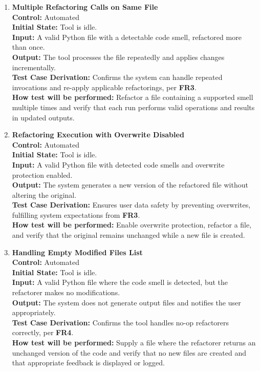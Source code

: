 \documentclass[12pt, titlepage]{article}
\begin{document}
\begin{enumerate}[label={\bf
\textcolor{Maroon}{test-FR-IA-\arabic*}}, wide=0pt, font=\itshape]
\item \textbf{Multiple Refactoring Calls on Same File} \\[2mm]
\textbf{Control:} Automated \\
\textbf{Initial State:} Tool is idle. \\
\textbf{Input:} A valid Python file with a detectable code smell, refactored more than once. \\
\textbf{Output:} The tool processes the file repeatedly and applies changes incrementally. \\[2mm]
\textbf{Test Case Derivation:} Confirms the system can handle repeated invocations and re-apply applicable refactorings, per \textbf{FR3}. \\[2mm]
\textbf{How test will be performed:} Refactor a file containing a supported smell multiple times and verify that each run performs valid operations and results in updated outputs.

\item \textbf{Refactoring Execution with Overwrite Disabled} \\[2mm]
\textbf{Control:} Automated \\
\textbf{Initial State:} Tool is idle. \\
\textbf{Input:} A valid Python file with detected code smells and overwrite protection enabled. \\
\textbf{Output:} The system generates a new version of the refactored file without altering the original. \\[2mm]
\textbf{Test Case Derivation:} Ensures user data safety by preventing overwrites, fulfilling system expectations from \textbf{FR3}. \\[2mm]
\textbf{How test will be performed:} Enable overwrite protection, refactor a file, and verify that the original remains unchanged while a new file is created.

\item \textbf{Handling Empty Modified Files List} \\[2mm]
\textbf{Control:} Automated \\
\textbf{Initial State:} Tool is idle. \\
\textbf{Input:} A valid Python file where the code smell is detected, but the refactorer makes no modifications. \\
\textbf{Output:} The system does not generate output files and notifies the user appropriately. \\[2mm]
\textbf{Test Case Derivation:} Confirms the tool handles no-op refactorers correctly, per \textbf{FR4}. \\[2mm]
\textbf{How test will be performed:} Supply a file where the refactorer returns an unchanged version of the code and verify that no new files are created and that appropriate feedback is displayed or logged.

\end{enumerate}
\end{document}

